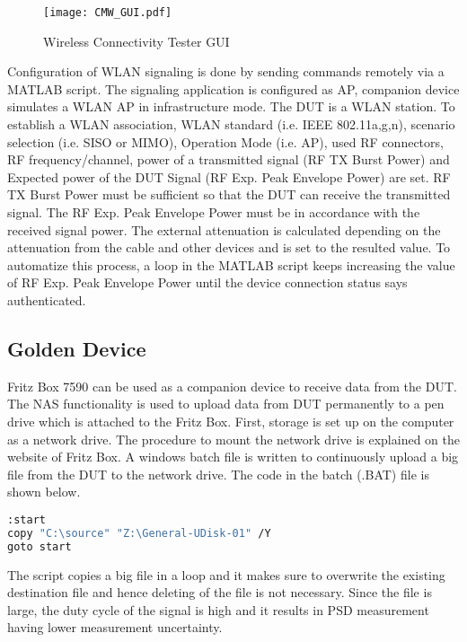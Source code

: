 \begin{figure}[H]
\centering
\texttt{[image: CMW\_GUI.pdf]}
\caption{Wireless Connectivity Tester \acs{GUI}}
\label{fig:cmwGUI}
\end{figure}

Configuration of \acs{WLAN} signaling is done by sending commands remotely via a MATLAB\textregistered{} script.  The signaling application is configured as \acf{AP}, companion device simulates a \acs{WLAN} \acf{AP} in infrastructure mode. The \acs{DUT} is a \acs{WLAN} station. To establish a \acs{WLAN} association, \acs{WLAN} standard (i.e. \acs{IEEE} 802.11a,g,n), scenario selection (i.e. \acs{SISO} or \acs{MIMO}), Operation Mode (i.e. \acs{AP}), used \acs{RF} connectors, \acs{RF} frequency/channel, power of a transmitted signal (\acs{RF} TX Burst Power) and Expected power of the \acs{DUT} Signal (\acs{RF} Exp. Peak Envelope Power) are set. \acs{RF} TX Burst Power must be sufficient so that the \acs{DUT} can receive the transmitted signal. The \acs{RF} Exp. Peak Envelope Power must be in accordance with the received signal power. The external attenuation is calculated depending on the attenuation from the cable and other devices and is set to the resulted value. To automatize this process, a loop in the MATLAB\textregistered{} script keeps increasing the value of \acs{RF} Exp. Peak Envelope Power until the device connection status says authenticated.

\subsection{Golden Device} \label{sec:golden}

Fritz Box 7590 can be used as a companion device to receive data from the \acs{DUT}. The \acf{NAS} functionality is used to upload data from \acs{DUT} permanently to a pen drive which is attached to the Fritz Box. First, storage is set up on the computer as a network drive. The procedure to mount the network drive is explained on the website of Fritz Box. A windows batch file is written to continuously upload a big file from the DUT to the network drive. The code in the batch (.BAT) file is shown below.

\begin{lstlisting}[language=bash]
:start
copy "C:\source" "Z:\General-UDisk-01" /Y
goto start
\end{lstlisting}

The script copies a big file in a loop and it makes sure to overwrite the existing destination file and hence deleting of the file is not necessary. Since the file is large, the duty cycle of the signal is high and it results in \ac{PSD} measurement having lower measurement uncertainty. 

